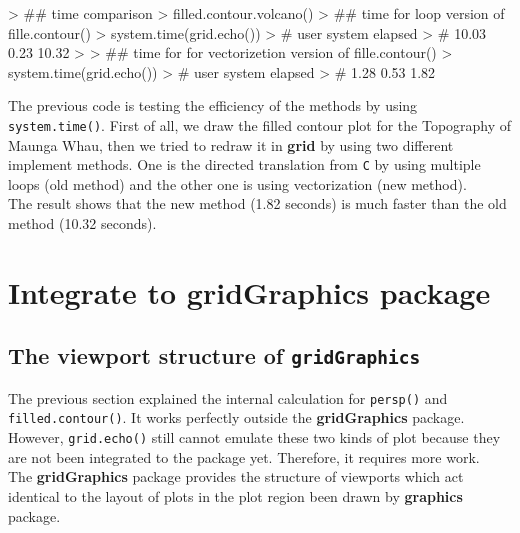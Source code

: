 \documentclass[11pt,twoside]{report}
\begin{document}
\begin{Schunk}
\begin{Sinput}
> ## time comparison
> filled.contour.volcano()
> ## time for loop version of fille.contour()
> system.time(grid.echo())
> # user  system elapsed 
> # 10.03    0.23   10.32 
> 
> ## time for for vectorizetion version of fille.contour()
> system.time(grid.echo())
> # user  system elapsed 
> # 1.28    0.53    1.82 
\end{Sinput}
\end{Schunk}


	The previous code is testing the efficiency of the methods by using \texttt{system.time()}. First of all, we draw the filled contour plot for the Topography of Maunga Whau, then we tried to redraw it in \textbf{grid} by using two different implement methods. One is the directed translation from \texttt{C} by using multiple loops (old method) and the other one is using vectorization (new method).\\
	The result shows that the new method (1.82 seconds) is much faster than the old method (10.32 seconds).

\chapter{Integrate to \textbf{gridGraphics} package}
\section{The viewport structure of \texttt{gridGraphics}}
The previous section explained the internal calculation for \texttt{persp()} and \texttt{filled.contour()}. It works perfectly outside the \textbf{gridGraphics} package. However, \texttt{grid.echo()} still cannot emulate these two kinds of plot because they are not been integrated to the package yet. Therefore, it requires more work.\\ 

The \textbf{gridGraphics} package provides the structure of viewports which act identical to the layout of plots in the plot region been drawn by \textbf{graphics} package. \\
\end{document}

